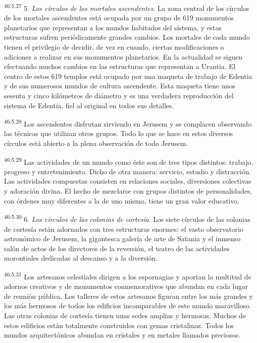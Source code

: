 \par
\textsuperscript{46:5.27} 5. \textit{Los círculos de los mortales ascendentes}. La zona central de los círculos de los mortales ascendentes está ocupada por un grupo de 619 monumentos planetarios que representan a los mundos habitados del sistema, y estas estructuras sufren periódicamente grandes cambios. Los mortales de cada mundo tienen el privilegio de decidir, de vez en cuando, ciertas modificaciones o adiciones a realizar en sus monumentos planetarios. En la actualidad se siguen efectuando muchos cambios en las estructuras que representan a Urantia. El centro de estos 619 templos está ocupado por una maqueta de trabajo de Edentia y de sus numerosos mundos de cultura ascendente. Esta maqueta tiene unos sesenta y cinco kilómetros de diámetro y es una verdadera reproducción del sistema de Edentia, fiel al original en todos sus detalles.

\par
\textsuperscript{46:5.28} Los ascendentes disfrutan sirviendo en Jerusem y se complacen observando las técnicas que utilizan otros grupos. Todo lo que se hace en estos diversos círculos está abierto a la plena observación de todo Jerusem.

\par
\textsuperscript{46:5.29} Las actividades de un mundo como éste son de tres tipos distintos: trabajo, progreso y entretenimiento. Dicho de otra manera: servicio, estudio y distracción. Las actividades compuestas consisten en relaciones sociales, diversiones colectivas y adoración divina. El hecho de mezclarse con grupos distintos de personalidades, con órdenes muy diferentes a la de uno mismo, tiene un gran valor educativo.

\par
\textsuperscript{46:5.30} 6. \textit{Los círculos de las colonias de cortesía}. Los siete círculos de las colonias de cortesía están adornados con tres estructuras enormes: el vasto observatorio astronómico de Jerusem, la gigantesca galería de arte de Satania y el inmenso salón de actos de los directores de la reversión, el teatro de las actividades morontiales dedicadas al descanso y a la diversión.

\par
\textsuperscript{46:5.31} Los artesanos celestiales dirigen a los espornagias y aportan la multitud de adornos creativos y de monumentos conmemorativos que abundan en cada lugar de reunión pública. Los talleres de estos artesanos figuran entre los más grandes y los más hermosos de todos los edificios incomparables de este mundo maravilloso. Las otras colonias de cortesía tienen unas sedes amplias y hermosas. Muchos de estos edificios están totalmente construidos con gemas cristalinas. Todos los mundos arquitectónicos abundan en cristales y en metales llamados preciosos.

